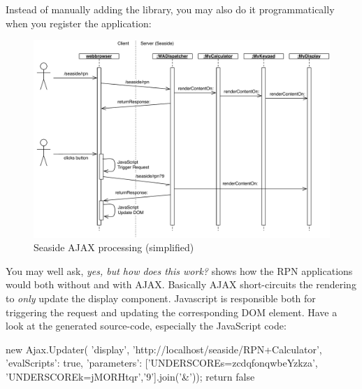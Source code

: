 \documentclass[a4paper,10pt,twoside]{book}
\begin{document}

Instead of manually adding the library, you may also do it programmatically when you register the application:
\begin{code}{}
MyCalculator class>>>initialize
	(self registerAsApplication: 'rpn')
		addLibrary: SULibrary}}
\end{code}

\begin{figure}[ht]
\begin{center}
\includegraphics[width=\textwidth]{ajax-processing}
\caption{Seaside AJAX processing (simplified)}
\label{fig:ajax-processing}
\end{center}
\end{figure}


You may well ask, \emph{yes, but how does this work?}
 shows how the RPN applications would both without and with AJAX.
Basically AJAX short-circuits the rendering to \emph{only} update the display component.
Javascript is responsible both for triggering the request and updating the corresponding DOM element.
Have a look at the generated source-code, especially the JavaScript code:

\begin{code}{}
new Ajax.Updater(
	'display',
	'http://localhost/seaside/RPN+Calculator',
	{'evalScripts': true,
	  'parameters': ['UNDERSCOREs=zcdqfonqwbeYzkza', 'UNDERSCOREk=jMORHtqr','9'].join('&')});
return false
\end{code}
\end{document}

